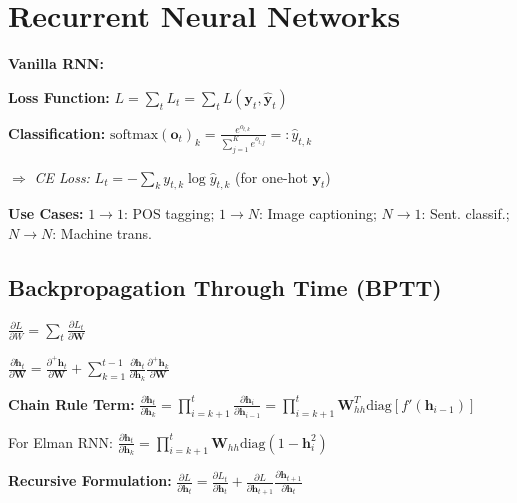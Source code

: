 \section{Recurrent Neural Networks}


\textbf{Vanilla RNN:} 

\textbf{Loss Function:} $L = \sum_t L_t = \sum_t L(\mathbf{y}_t, \hat{\mathbf{y}}_t)$

\textbf{Classification:}
$\text{softmax}(\mathbf{o}_t)_k = \frac{e^{o_{t,k}}}{\sum_{j=1}^K e^{o_{t,j}}} =: \hat{y}_{t,k}$ 

$\Rightarrow$ \textit{CE Loss:} $L_t = -\sum_k y_{t,k} \log \hat{y}_{t,k}$ (for one-hot $\mathbf{y}_t$)

\textbf{Use Cases:} {\small $1 \to 1$: POS tagging; $1 \to N$: Image captioning; $N \to 1$: Sent. classif.; $N \to N$: Machine trans.}


\subsection{Backpropagation Through Time (BPTT)}
{\small
$\frac{\partial L}{\partial W} = \sum_t \frac{\partial L_t}{\partial \mathbf{W}} \quad$ 

$\frac{\partial \mathbf{h}_t}{\partial \mathbf{W}} = \frac{\partial^+ \mathbf{h}_t}{\partial \mathbf{W}} + \sum_{k=1}^{t-1} \frac{\partial \mathbf{h}_t}{\partial \mathbf{h}_k} \frac{\partial^+ \mathbf{h}_k}{\partial \mathbf{W}}$

\textbf{Chain Rule Term:} $\frac{\partial \mathbf{h}_t}{\partial \mathbf{h}_k} = \prod_{i=k+1}^t \frac{\partial \mathbf{h}_i}{\partial \mathbf{h}_{i-1}} = \prod_{i=k+1}^t \mathbf{W}_{hh}^T \text{diag}[f'(\mathbf{h}_{i-1})]$

For Elman RNN: $\frac{\partial \mathbf{h}_t}{\partial \mathbf{h}_k} = \prod_{i=k+1}^t \mathbf{W}_{hh} \text{diag}(1 - \mathbf{h}_i^2)$

\textbf{Recursive Formulation:}
$\frac{\partial L}{\partial \mathbf{h}_t} = \frac{\partial L_t}{\partial \mathbf{h}_t} + \frac{\partial L}{\partial \mathbf{h}_{t+1}} \frac{\partial \mathbf{h}_{t+1}}{\partial \mathbf{h}_t}$}

